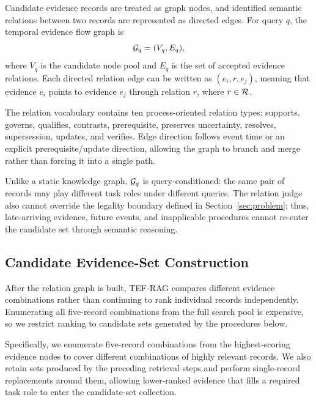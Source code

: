 Candidate evidence records are treated as graph nodes, and identified semantic relations between two records are represented as directed edges. For query $q$, the temporal evidence flow graph is
\begin{equation}
\mathcal{G}_q=(V_q,E_q),
\end{equation}
where $V_q$ is the candidate node pool and $E_q$ is the set of accepted evidence relations. Each directed relation edge can be written as $(e_i,r,e_j)$, meaning that evidence $e_i$ points to evidence $e_j$ through relation $r$, where $r\in\mathcal{R}$.

The relation vocabulary contains ten process-oriented relation types: supports, governs, qualifies, contrasts, prerequisite, preserves uncertainty, resolves, supersession, updates, and verifies. Edge direction follows event time or an explicit prerequisite/update direction, allowing the graph to branch and merge rather than forcing it into a single path.

Unlike a static knowledge graph, $\mathcal{G}_q$ is query-conditioned: the same pair of records may play different task roles under different queries. The relation judge also cannot override the legality boundary defined in Section~\ref{sec:problem}; thus, late-arriving evidence, future events, and inapplicable procedures cannot re-enter the candidate set through semantic reasoning.

\subsection{Candidate Evidence-Set Construction}

After the relation graph is built, TEF-RAG compares different evidence combinations rather than continuing to rank individual records independently. Enumerating all five-record combinations from the full search pool is expensive, so we restrict ranking to candidate sets generated by the procedures below.

Specifically, we enumerate five-record combinations from the highest-scoring evidence nodes to cover different combinations of highly relevant records. We also retain sets produced by the preceding retrieval steps and perform single-record replacements around them, allowing lower-ranked evidence that fills a required task role to enter the candidate-set collection.

